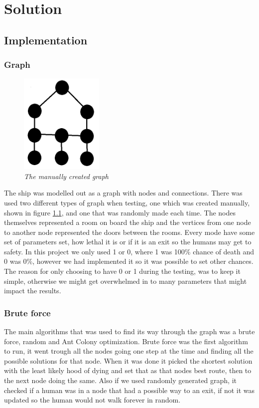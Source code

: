 \chapter{Solution}
\label{ch:solution}


\section{Implementation}

\subsection{Graph}
\begin{figure} %
\includegraphics[width=40mm]{images/manuallyGraph.png}
\caption{\textit{The manually created graph}}
\label{smallgraph}
\end{figure}
The ship was modelled out as a graph with nodes and connections. There was used two different types of graph when testing, one which was created manually, shown in figure \ref{smallgraph}, and one that was randomly made each time. The nodes themselves represented a room on board the ship and the vertices from one node to another node represented the doors between the rooms. Every mode have some set of parameters set, how lethal it is or if it is an exit so the humans may get to safety. In this project we only used 1 or 0, where 1 was 100\% chance of death and 0 was 0\%, however we had implemented it so it was possible to set other chances. The reason for only choosing to have 0 or 1 during the testing, was to keep it simple, otherwise we might get overwhelmed in to many parameters that might impact the results. 


\subsection{Brute force}
The main algorithms that was used to find its way through the graph was a brute force, random and Ant Colony optimization. Brute force was the first algorithm to run, it went trough all the nodes going one step at the time and finding all the possible solutions for that node. When it was done it picked the shortest solution with the least likely hood of dying and set that as that nodes best route, then to the next node doing the same. Also if we used randomly generated graph, it checked if a human was in a node that had a possible way to an exit, if not it was updated so the human would not walk forever in random. 


